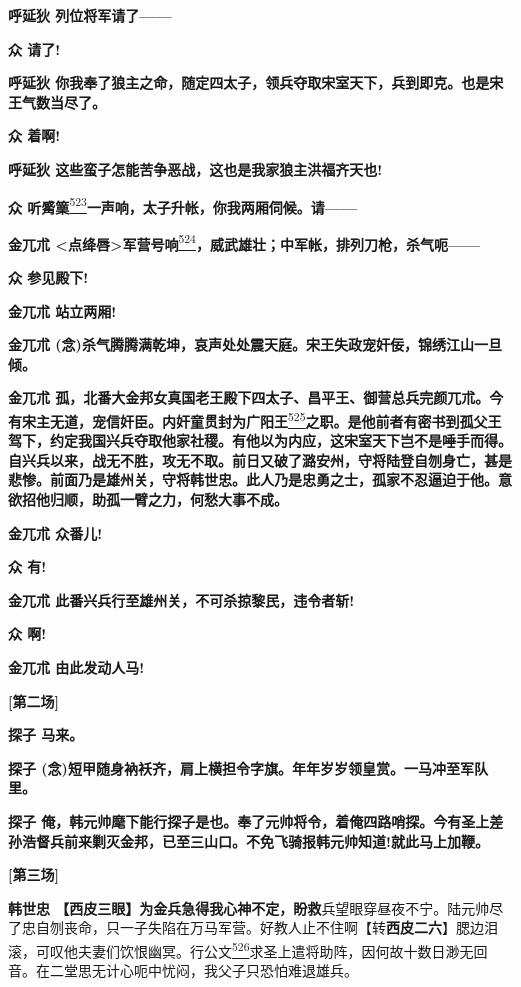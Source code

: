 \textbf{呼延狄 列位将军请了------}

\textbf{众 请了!}

\textbf{呼延狄
你我奉了狼主之命，随定四太子，领兵夺取宋室天下，兵到即克。也是宋王气数当尽了。}

\textbf{众 着啊!}

\textbf{呼延狄 这些蛮子怎能苦争恶战，这也是我家狼主洪福齐天也!}

\textbf{众
听觱篥}\protect\hyperlink{fn523}{\textsuperscript{523}}\textbf{一声响，太子升帐，你我两厢伺候。请------}

\textbf{金兀朮
\textless{}点绛唇\textgreater{}军营号响}\protect\hyperlink{fn524}{\textsuperscript{524}}\textbf{，威武雄壮；中军帐，排列刀枪，杀气呃------}

\textbf{众 参见殿下!}

\textbf{金兀朮 站立两厢!}

\textbf{金兀朮
(念)杀气腾腾满乾坤，哀声处处震天庭。宋王失政宠奸佞，锦绣江山一旦倾。}

\textbf{金兀朮
孤，北番大金邦女真国老王殿下四太子、昌平王、御营总兵完颜兀朮。今有宋主无道，宠信奸臣。内奸童贯封为广阳王}\protect\hyperlink{fn525}{\textsuperscript{525}}\textbf{之职。是他前者有密书到孤父王驾下，约定我国兴兵夺取他家社稷。有他以为内应，这宋室天下岂不是唾手而得。自兴兵以来，战无不胜，攻无不取。前日又破了潞安州，守将陆登自刎身亡，甚是悲惨。前面乃是雄州关，守将韩世忠。此人乃是忠勇之士，孤家不忍逼迫于他。意欲招他归顺，助孤一臂之力，何愁大事不成。}

\textbf{金兀朮 众番儿!}

\textbf{众 有!}

\textbf{金兀朮 此番兴兵行至雄州关，不可杀掠黎民，违令者斩!}

\textbf{众 啊!}

\textbf{金兀朮 由此发动人马!}

\textbf{{[}第二场{]}}

\textbf{探子 马来。}

\textbf{探子
(念)短甲随身衲袄齐，肩上横担令字旗。年年岁岁领皇赏。一马冲至军队里。}

\textbf{探子
俺，韩元帅麾下能行探子是也。奉了元帅将令，着俺四路哨探。今有圣上差孙浩督兵前来剿灭金邦，已至三山口。不免飞骑报韩元帅知道!就此马上加鞭。}

\textbf{{[}第三场{]}}

\textbf{韩世忠
【西皮三眼】为金兵急得我心神不定，盼救}兵望眼穿昼夜不宁。陆元帅尽了忠自刎丧命，只一子失陷在万马军营。好教人止不住啊【转\textbf{西皮二六}】腮边泪滚，可叹他夫妻们饮恨幽冥。行公文\protect\hyperlink{fn526}{\textsuperscript{526}}求圣上遣将助阵，因何故十数日渺无回音。在二堂思无计心呃中忧闷，我父子只恐怕难退雄兵。

